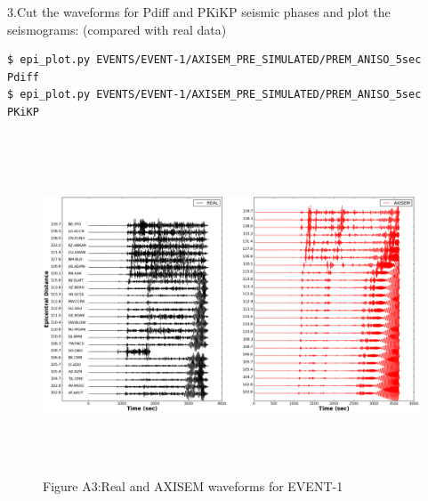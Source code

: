 \documentclass{article}
\begin{document}
3.Cut the waveforms for Pdiff and PKiKP seismic phases and plot the seismograms: 
(compared with real data)
\begin{lstlisting}
$ epi_plot.py EVENTS/EVENT-1/AXISEM_PRE_SIMULATED/PREM_ANISO_5sec Pdiff
$ epi_plot.py EVENTS/EVENT-1/AXISEM_PRE_SIMULATED/PREM_ANISO_5sec PKiKP
\end{lstlisting}

\begin{figure}
\begin{center}
\includegraphics[width=497pt, height=287pt, keepaspectratio=true]{AXISEMTutorial-fig007.png}
{\small{}Figure A3:Real and AXISEM waveforms for EVENT-1}
\end{center}
\end{figure}
\end{document}
